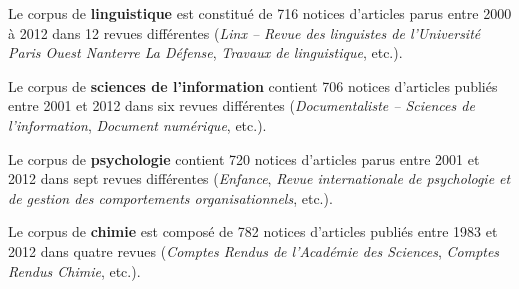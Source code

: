   Le corpus de \textbf{linguistique} est constitué de 716 notices d'articles
  parus entre 2000 à 2012 dans 12 revues différentes (\textit{Linx -- Revue des
  linguistes de l'Université Paris Ouest Nanterre La Défense}, \textit{Travaux
  de linguistique}, etc.).

  Le corpus de \textbf{sciences de l'information} contient 706 notices
  d'articles publiés entre 2001 et 2012 dans six revues différentes
  (\textit{Documentaliste -- Sciences de l'information}, \textit{Document
  numérique}, etc.).

  Le corpus de \textbf{psychologie} contient 720 notices d'articles parus
  entre 2001 et 2012 dans sept revues différentes (\textit{Enfance},
  \textit{Revue internationale de psychologie et de gestion des comportements
  organisationnels}, etc.).

  Le corpus de \textbf{chimie} est composé de 782 notices d'articles publiés
  entre 1983 et 2012 dans quatre revues (\textit{Comptes Rendus de l'Académie
  des Sciences}, \textit{Comptes Rendus Chimie}, etc.).



